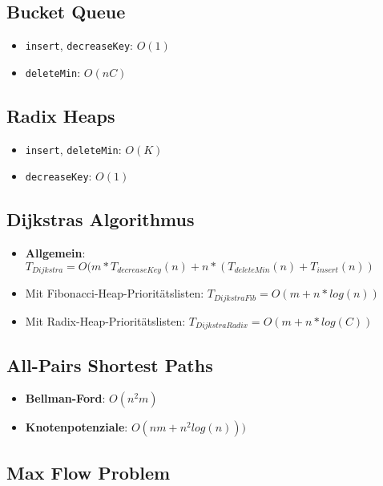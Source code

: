 \subsection{Bucket Queue}%
\label{lz:sub:bucket_queue}

\begin{itemize}
	\item \texttt{insert}, \texttt{decreaseKey}: $O(1)$
	\item \texttt{deleteMin}: $O(nC)$
\end{itemize}

\subsection{Radix Heaps}%
\label{lz:sub:radix_heaps}

\begin{itemize}
	\item \texttt{insert}, \texttt{deleteMin}: $O(K)$
	\item \texttt{decreaseKey}: $O(1)$
\end{itemize}

\subsection{Dijkstras Algorithmus}%
\label{lz:sub:dijkstras_algorithmus}

\begin{itemize}
	\item \textbf{Allgemein}: $T_{Dijkstra} = O(m * T_{decreaseKey}(n) + n * (T_{deleteMin}(n) + T_{insert}(n))$
	\item Mit Fibonacci-Heap-Prioritätslisten: $T_{DijkstraFib} = O(m + n * log (n))$
	\item Mit Radix-Heap-Prioritätslisten: $T_{DijkstraRadix} = O(m + n * log (C))$
\end{itemize}

\subsection{All-Pairs Shortest Paths}%
\label{lz:sub:all_pairs_shortest_paths}

\begin{itemize}
	\item \textbf{Bellman-Ford}: $O(n^2m)$
	\item \textbf{Knotenpotenziale}: $O(nm + n^2log(n)))$
\end{itemize}

\subsection{Max Flow Problem}%
\label{lz:sub:max_flow_problem}

